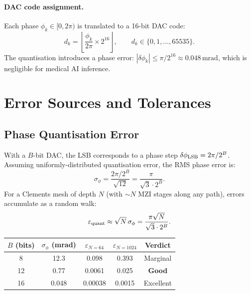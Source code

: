 \documentclass[12pt, a4paper]{article}
\begin{document}
\paragraph{DAC code assignment.}
Each phase $\phi_k\in[0,2\pi)$ is translated to a 16-bit DAC code:
\begin{equation}
  d_k = \left\lfloor \frac{\phi_k}{2\pi}\times 2^{16} \right\rfloor,
  \qquad d_k\in\{0,1,\ldots,65535\}.
  \label{eq:dac_code}
\end{equation}
The quantisation introduces a phase error:
$|\delta\phi_k| \leq \pi/2^{16} \approx 0.048\,\mathrm{mrad}$,
which is negligible for medical AI inference.

\section{Error Sources and Tolerances}
\label{sec:errors}

\subsection{Phase Quantisation Error}

With a $B$-bit DAC, the LSB corresponds to a phase step
$\delta\phi_{\rm LSB} = 2\pi/2^B$.
Assuming uniformly-distributed quantisation error, the RMS phase error is:
\begin{equation}
  \sigma_\phi = \frac{2\pi/2^B}{\sqrt{12}} = \frac{\pi}{\sqrt{3}\cdot 2^B}.
  \label{eq:phase_quant_rms}
\end{equation}
For a Clements mesh of depth $N$ (with $\sim N$ MZI stages along any path),
errors accumulate as a random walk:
\begin{equation}
  \varepsilon_{\rm quant} \approx \sqrt{N}\,\sigma_\phi
  = \frac{\pi\sqrt{N}}{\sqrt{3}\cdot 2^B}.
  \label{eq:quant_accumulation}
\end{equation}

\begin{center}
\begin{tabular}{ccccc}
\toprule
$B$ (bits) & $\sigma_\phi$ (mrad) & $\varepsilon_{N=64}$ & $\varepsilon_{N=1024}$ & Verdict \\
\midrule
8  & 12.3 & 0.098 & 0.393 & Marginal \\
12 & 0.77 & 0.0061 & 0.025 & \textbf{Good} \\
16 & 0.048 & 0.00038 & 0.0015 & Excellent \\
\bottomrule
\end{tabular}
\end{center}
\end{document}
